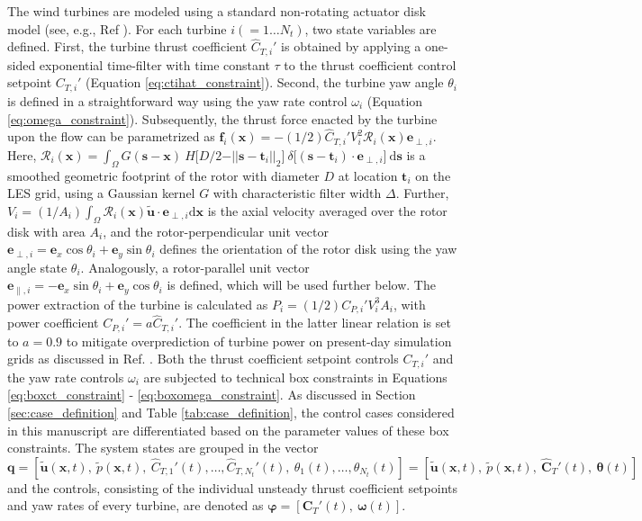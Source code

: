 \documentclass[energies,article,submit,moreauthors,latex,10pt,a4paper]{mdpi}
\newcommand{\ds}{~\text{d}\boldsymbol{s}}
\newcommand{\bs}[1]{\boldsymbol{#1}}
\newcommand{\dx}{\text{d}\boldsymbol{x}}
\newcommand{\sint}{\int_{\Omega}}
\newcommand{\utilde}{\widetilde{\bs{u}}}
\newcommand{\ptilde}{\widetilde{p}}
\newcommand{\ctnhat}[1]{\widehat{C}_{T,#1}'}
\newcommand{\ctihat}{\widehat{C}_{T,i}'}
\newcommand{\cti}{C_{T,i}'}
\newcommand{\ctn}[1]{C_{T,#1}'}
\newcommand{\R}{\mathscr{R}}
\newcommand{\eperpi}{\bs{e}_{\perp,i}}
\newcommand{\etransi}{\bs{e}_{\parallel,i}}
\newcommand{\ex}{\bs{e}_x}
\newcommand{\ey}{\bs{e}_y}
\newcommand{\diracdelta}{{\delta}}
\begin{document}
The wind turbines are modeled using a standard non-rotating actuator disk model (see, e.g., Ref \cite{meyers2010large}). For each turbine $i (= 1 \dots N_t)$, two state variables are defined. First, the turbine thrust coefficient $\ctihat$ is obtained by applying a one-sided exponential time-filter with time constant $\tau$ to the thrust coefficient control setpoint $\cti$ (Equation \ref{eq:ctihat_constraint}). Second, the turbine yaw angle $\theta_i$ is defined in a straightforward way using the yaw rate control $\omega_i$ (Equation \ref{eq:omega_constraint}). Subsequently, the thrust force enacted by the turbine upon the flow can be parametrized as $\bs{f}_{i}(\bs{x}) = - (1/2) \ctihat V_i^2 \R_i (\bs{x}) \eperpi$. Here, $\R_i(\bs{x}) = \sint G(\bs{s} - \bs{x})~H\big[D/2 - \vert\vert \bs{s} - \bs{t}_i \vert\vert_2\big]~\diracdelta \big[ (\bs{s} - \bs{t}_i)\cdot \eperpi \big] \ds$ is a smoothed geometric footprint of the rotor with diameter $D$ at location $\bs{t}_i$ on the LES grid, using a Gaussian kernel $G$ with characteristic filter width $\Delta$. Further, $V_i = (1/A_i) \int_{\Omega} \R_i(\bs{x}) \utilde \cdot \eperpi \dx$ is the axial velocity averaged over the rotor disk with area $A_i$, and the rotor-perpendicular unit vector $\eperpi = \ex \cos \theta_i + \ey \sin \theta_i$ defines the orientation of the rotor disk using the yaw angle state $\theta_i$. Analogously, a rotor-parallel unit vector $\etransi = - \bs{e}_x \sin \theta_i + \bs{e}_y \cos \theta_i$ is defined, which will be used further below. The power extraction of the turbine is calculated as $P_i = (1/2) C_{P,i}' V_i^3 A_i$, with power coefficient $C_{P,i}' = a \ctihat$. The coefficient in the latter linear relation is set to $a = 0.9$ to mitigate overprediction of turbine power on present-day simulation grids as discussed in Ref. \cite{munters2017optimal}. Both the thrust coefficient setpoint controls $\cti$ and the yaw rate controls $\omega_i$ are subjected to technical box constraints in Equations \eqref{eq:boxct_constraint} - \eqref{eq:boxomega_constraint}. As discussed in Section \ref{sec:case_definition} and Table \ref{tab:case_definition}, the control cases considered in this manuscript are differentiated based on the parameter values of these box constraints. The system states are grouped in the vector $\bs{q} = [\utilde(\bs{x},t),~\ptilde(\bs{x},t),~\ctnhat{1}(t), \dots, \ctnhat{N_t}(t),~ \theta_1(t), \dots, \theta_{N_t}(t)] = [\utilde(\bs{x},t),~\ptilde(\bs{x},t),~\widehat{\bs{C}}_T'(t) ,~ \bs{\theta}(t)]$ and the controls, consisting of the individual unsteady thrust coefficient setpoints and yaw rates of every turbine, are denoted as $\bs{\varphi} = [\bs{C}_T'(t),~\bs{\omega}(t)]$.%
\end{document}
